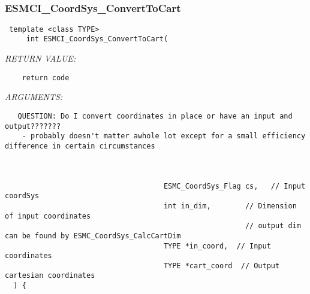  
\mbox{}\hrulefill\
 
\subsubsection [ESMCI\_CoordSys\_ConvertToCart] {ESMCI\_CoordSys\_ConvertToCart}


  
\begin{verbatim} template <class TYPE>
     int ESMCI_CoordSys_ConvertToCart(\end{verbatim}{\em RETURN VALUE:}
\begin{verbatim}    return code
   \end{verbatim}{\em ARGUMENTS:}
\begin{verbatim} 
   QUESTION: Do I convert coordinates in place or have an input and output???????
    - probably doesn't matter awhole lot except for a small efficiency difference in certain circumstances
 
 
 
                                     ESMC_CoordSys_Flag cs,   // Input coordSys
                                     int in_dim,        // Dimension of input coordinates
                                                        // output dim can be found by ESMC_CoordSys_CalcCartDim 
                                     TYPE *in_coord,  // Input coordinates 
                                     TYPE *cart_coord  // Output cartesian coordinates 
  ) {\end{verbatim}

\setlength{\parskip}{\oldparskip}
\setlength{\parindent}{\oldparindent}
\setlength{\baselineskip}{\oldbaselineskip}
